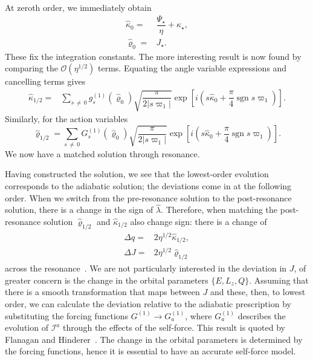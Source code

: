 \documentclass[aps,prd,amsfonts,amssymb,amsmath,nofootinbib,showpacs,superscriptaddress,twocolumn,floatfix]{revtex4-1}
\newcommand{\recip}[1]{\ensuremath{\frac{1}{#1}}}
\newcommand{\order}[1]{\ensuremath{\mathcal{O}({#1})}}
\DeclareMathOperator{\sgn}{sgn}
\begin{document}
At zeroth order, we immediately obtain
\begin{align}
\widehat{\kappa}_0 = {} & \dfrac{\Psi_\star}{\eta} + \kappa_\star, \\
\widehat{\varrho}_0 = {} & J_\star.
\end{align}
These fix the integration constants. The more interesting result is now found by comparing the $\order{\eta^{1/2}}$ terms. Equating the angle variable expressions and cancelling terms gives
\begin{align}
\widehat{\kappa}_{1/2} = {} & \sum_{s\,\neq\,0}g_s^{(1)}(\widehat{\varrho}_0)\sqrt{\dfrac{\pi}{2|s\varpi_1|}}\exp\left[i\left(s \widehat{\kappa}_0 + \dfrac{\pi}{4}\sgn s\varpi_1\right)\right].
\end{align}
Similarly, for the action variables
\begin{equation}
\widehat{\varrho}_{1/2} = \sum_{s\,\neq\,0}G_s^{(1)}(\widehat{\varrho}_0)\sqrt{\dfrac{\pi}{2|s\varpi_1|}}\exp\left[i\left(s \widehat{\kappa}_0 + \dfrac{\pi}{4}\sgn s\varpi_1\right)\right].
\label{eq:J-1/2}
\end{equation}
We now have a matched solution through resonance.

Having constructed the solution, we see that the lowest-order evolution corresponds to the adiabatic solution; the deviations come in at the following order. When we switch from the pre-resonance solution to the post-resonance solution, there is a change in the sign of $\widehat{\lambda}$. Therefore, when matching the post-resonance solution $\widehat{\varrho}_{1/2}$ and $\widehat{\kappa}_{1/2}$ also change sign: there is a change of
\begin{align}
\Delta q = {} & 2 \eta^{1/2}\widehat{\kappa}_{1/2}, \\
\Delta J = {} & 2 \eta^{1/2}\widehat{\varrho}_{1/2}
\label{eq:jumps}
\end{align}
across the resonance~\cite{Kevorkian1987}. We are not particularly interested in the deviation in $J$, of greater concern is the change in the orbital parameters $\{E,L_z,Q\}$. Assuming that there is a smooth transformation that maps between $J$ and these, then, to lowest order, we can calculate the deviation relative to the adiabatic prescription by substituting the forcing functions $G^{(1)} \rightarrow G_a^{(1)}$, where $G_a^{(1)}$ describes the evolution of $\mathcal{I}^a$ through the effects of the self-force. This result is quoted by Flanagan and Hinderer~\cite{Flanagan2012}. The change in the orbital parameters is determined by the forcing functions, hence it is essential to have an accurate self-force model.
\end{document}
